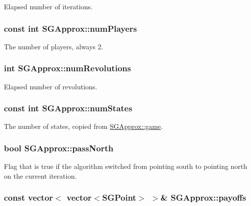 Elapsed number of iterations. \hypertarget{classSGApprox_a6f512c1cb974247ecb24c2201f045905}{
\subsubsection[{num\-Players}]{\setlength{\rightskip}{0pt plus 5cm}const int S\-G\-Approx\-::num\-Players\hspace{0.3cm}{\ttfamily [private]}}}\label{classSGApprox_a6f512c1cb974247ecb24c2201f045905}
The number of players, always 2. \hypertarget{classSGApprox_a2bd0cab80a3f8d799fdc2841b65dd2c2}{
\subsubsection[{num\-Revolutions}]{\setlength{\rightskip}{0pt plus 5cm}int S\-G\-Approx\-::num\-Revolutions\hspace{0.3cm}{\ttfamily [private]}}}\label{classSGApprox_a2bd0cab80a3f8d799fdc2841b65dd2c2}
Elapsed number of revolutions. \hypertarget{classSGApprox_a676bda37d610e501eac72037d22b5293}{
\subsubsection[{num\-States}]{\setlength{\rightskip}{0pt plus 5cm}const int S\-G\-Approx\-::num\-States\hspace{0.3cm}{\ttfamily [private]}}}\label{classSGApprox_a676bda37d610e501eac72037d22b5293}
The number of states, copied from \hyperlink{classSGApprox_a0774e3ed0ff009809606a42c9e7ef727}{S\-G\-Approx\-::game}. \hypertarget{classSGApprox_aec0377b26f0efaea314f72554a8862b9}{
\subsubsection[{pass\-North}]{\setlength{\rightskip}{0pt plus 5cm}bool S\-G\-Approx\-::pass\-North\hspace{0.3cm}{\ttfamily [private]}}}\label{classSGApprox_aec0377b26f0efaea314f72554a8862b9}
Flag that is true if the algorithm switched from pointing south to pointing north on the current iteration. \hypertarget{classSGApprox_a053be8812a4cba4f529379dbfab0c5aa}{
\subsubsection[{payoffs}]{\setlength{\rightskip}{0pt plus 5cm}const vector$<$ vector$<${\bf S\-G\-Point}$>$ $>$\& S\-G\-Approx\-::payoffs\hspace{0.3cm}{\ttfamily [private]}}}\label{classSGApprox_a053be8812a4cba4f529379dbfab0c5aa}

